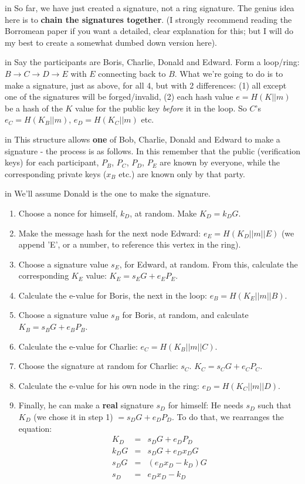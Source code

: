 \documentclass[10pt,a4paper]{article}
\begin{document}
 in \noindent So far, we have just created a signature, not a ring signature. The genius idea here is to \textbf{chain the signatures together}. (I strongly recommend reading the Borromean paper \cite{borromean} if you want a detailed, clear explanation for this; but I will do my best to create a somewhat dumbed down version here).

 in \noindent Say the participants are Boris, Charlie, Donald and Edward. Form a loop/ring: $B \rightarrow C \rightarrow D \rightarrow E$ with $E$ connecting back to $B$. What we're going to do is to make a signature, just as above, for all 4, but with 2 differences: (1) all except one of the signatures will be forged/invalid, (2) each hash value $e = H(K||m)$ be a hash of the $K$ value for the public key \textit{before} it in the loop. So $C$'s $e_C = H(K_B || m)$, $e_D = H(K_C||m)$ etc.

 in \noindent This structure allows \textbf{one} of Bob, Charlie, Donald and Edward to make a signature - the process is as follows. In this remember that the public (verification keys) for each participant, $P_B$, $P_C$, $P_D$, $P_E$ are known by everyone, while the corresponding private keys ($x_B$ etc.) are known only by that party.

 in \noindent We'll assume Donald is the one to make the signature.

\begin{enumerate}
\item Choose a nonce for himself, $k_D$, at random. Make $K_D = k_{D}G$.
\item Make the message hash for the next node Edward: $e_E = H(K_D||m||E)$ (we append 'E', or a number, to reference this vertex in the ring).
\item Choose a signature value $s_E$, for Edward, at random. From this, calculate the corresponding $K_E$ value: $K_E = s_{E}G +e_{E}P_{E}$.
\item Calculate the e-value for Boris, the next in the loop: $e_B = H(K_E || m || B)$.
\item Choose a signature value $s_B$ for Boris, at random, and calculate $K_B = s_{B}G + e_{B}P_{B}$.
\item Calculate the e-value for Charlie: $e_C = H(K_B || m || C)$.
\item Choose the signature at random for Charlie: $s_C$. $K_C = s_{C}G + e_{C}P_{C}$.
\item Calculate the e-value for his own node in the ring: $e_D = H(K_C || m || D)$.
\item Finally, he can make a \textbf{real} signature $s_D$ for himself: He needs $s_D$ such that $K_D$ (we chose it in step 1) $= s_{D}G + e_{D}P_{D}$. To do that, we rearranges the equation:
\begin{eqnarray*}
K_D &=& s_{D}G + e_{D}P_D \\
k_{D}G &=& s_{D}G + e_{D}x_{D}G \\
s_{D}G &=& \left(e_{D}x_{D} - k_{D}\right)G \\
s_D &=& e_{D}x_{D} - k_D
\end{eqnarray*}
\end{enumerate}
\end{document}
